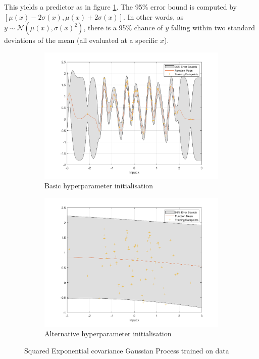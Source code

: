 \documentclass[]{article}
\newcommand{\Ncal}{\mathcal{N}}
\begin{document}
This yields a predictor as in figure \ref{fig:1a}. The 95\% error bound is computed by $[\mu(x) - 2\sigma(x), \mu(x) + 2\sigma(x)]$. In other words, as $y \sim \Ncal(\mu(x), \sigma(x)^2)$, there is a 95\% chance of $y$ falling within two standard deviations of the mean (all evaluated at a specific $x$).

\begin{figure}[!h]
	\begin{subfigure}{0.5\linewidth}
		\centering
		\includegraphics[width=\linewidth]{1a}
		\caption{Basic hyperparameter initialisation}
		\label{fig:1a}
	\end{subfigure}
	\begin{subfigure}{0.5\linewidth}
		\centering
		\includegraphics[width=\linewidth]{1b}
		\caption{Alternative hyperparameter initialisation}
		\label{fig:1b}
	\end{subfigure}
	\caption{Squared Exponential covariance Gaussian Process trained on data}
	\label{fig:1}
\end{figure}
\end{document}

